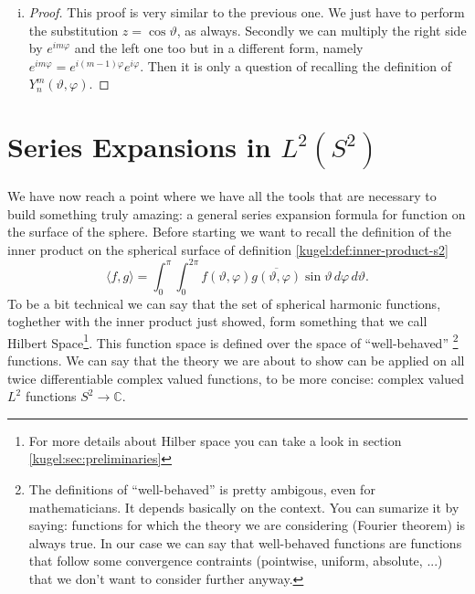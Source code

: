 \begin{enumerate}[(i)]
\begin{proof}
\begin{align*}
      &= \dfrac{e^{-i\varphi}}{2n+1}\left[ P^{m+1}_{n+1}(\cos \vartheta)e^{i(m+1)\varphi} - P^{m+1}_{n-1}(\cos \vartheta)e^{i(m+1)\varphi}\right].
    \end{align*}
    A few manipulations later, we will obtain
    \begin{equation*}
      Y^m_n(\vartheta, \varphi) = \frac{e^{-i\varphi}}{(2n+1)\sin \vartheta} \left[ Y^{m+1}_{n+1}(\vartheta, \varphi)-Y^{m+1}_{n-1}(\vartheta, \varphi) \right].
    \end{equation*}
  \end{proof}
  \item 
  \begin{proof}
    This proof is very similar to the previous one. We just have to perform the substitution $z = \cos \vartheta$, as always. Secondly we can multiply the right side by $e^{im\varphi}$ and the left one too but in a different form, namely $e^{im\varphi}=e^{i(m-1)\varphi}e^{i\varphi}$. Then it is only a question of recalling the definition of $Y^m_n(\vartheta, \varphi)$.
  \end{proof}
\end{enumerate}

\section{Series Expansions in $L^2(S^2)$}
We have now reach a point where we have all the tools that are necessary to build something truly amazing: a general series expansion formula for
function on the surface of the sphere.
Before starting we want to recall the definition of the inner product on the spherical surface of definition \ref{kugel:def:inner-product-s2}
\begin{equation*}
  \langle f, g \rangle
  = \int_{0}^\pi \int_0^{2\pi}
    f(\vartheta, \varphi) \overline{g(\vartheta, \varphi)}
    \sin \vartheta \, d\varphi \, d\vartheta.
\end{equation*}
To be a bit technical we can say that the set of spherical harmonic functions, toghether with the inner product just showed, 
form something that we call Hilbert Space\footnote{For more details about Hilber space you can take a look in section \ref{kugel:sec:preliminaries}}. 
This function space is defined over the space of ``well-behaved'' \footnote{The definitions of ``well-behaved'' is pretty ambigous, even for mathematicians. 
It depends basically on the context.
You can sumarize it by saying: functions for which the theory we are considering (Fourier theorem) is always true. In our case we can say that well-behaved functions 
are functions that follow some convergence contraints (pointwise, uniform, absolute, ...) that we don't want to consider further anyway.} functions. 
We can say that the theory we are about to show can be applied on all twice differentiable complex valued functions, 
to be more concise: complex valued $L^2$ functions $S^2 \to \mathbb{C}$.

